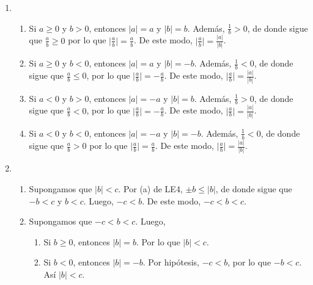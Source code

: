 \documentclass[11pt]{article}
\begin{document}
\begin{enumerate}[label=\alph*),font=\bfseries]

    \item 
        \begin{enumerate}[label=\roman*),font=\bfseries]
            \item Si $a \geq 0$ y $b>0$, entonces $|a|=a$ y $|b|=b$. Además, $\frac{1}{b} >0$, de donde sigue que $\frac{a}{b} \geq 0$ por lo que $\big| \frac{a}{b} \big| = \frac{a}{b}$. De este modo, $ \big| \frac{a}{b} \big| = \frac{|a|}{|b|}$.
            \item Si $a \geq 0$ y $b<0$, entonces $|a|=a$ y $|b|=-b$. Además, $\frac{1}{b} <0$, de donde sigue que $\frac{a}{b} \leq 0$, por lo que $\big| \frac{a}{b} \big| =- \frac{a}{b}$. De este modo, $ \big| \frac{a}{b} \big| = \frac{|a|}{|b|}$.
            \item Si $a<0$ y $b>0$, entonces $|a|=-a$ y $|b|=b$. Además, $\frac{1}{b} >0$, de donde sigue que $\frac{a}{b} < 0$, por lo que $\big| \frac{a}{b} \big| =- \frac{a}{b}$. De este modo, $ \big| \frac{a}{b} \big| = \frac{|a|}{|b|}$.
            \item Si $a<0$ y $b<0$, entonces $|a|=-a$ y $|b|=-b$. Además, $\frac{1}{b} <0$, de donde sigue que $\frac{a}{b} > 0$ por lo que $\big| \frac{a}{b} \big| = \frac{a}{b}$. De este modo, $ \big| \frac{a}{b} \big| = \frac{|a|}{|b|}$.
        \end{enumerate}

        
    \item
        \begin{enumerate}[label=\roman*),font=\bfseries]
            \item Supongamos que $|b|<c$. Por (a) de LE4, $ \pm b \leq |b|$, de donde sigue que $-b<c$ y $b<c$. Luego, $-c<b$. De este modo, $-c<b<c$.
            \item Supongamos que $-c<b<c$. Luego,
                \begin{enumerate}[label=\arabic*),font=\bfseries]
                    \item Si $b \geq 0$, entonces $|b|=b$. Por lo que $|b|<c$.
                    \item Si $b < 0$, entonces $|b|=-b$. Por hipótesis, $-c<b$, por lo que $-b<c$. Así $|b|<c$.
                \end{enumerate}
        \end{enumerate}
    


\end{enumerate}
\end{document}
